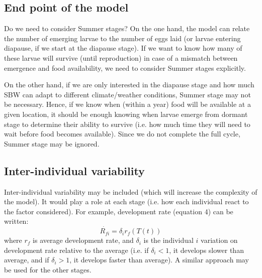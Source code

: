 \documentclass[12 pt]{article}
\begin{document}
\subsection{End point of the model}
Do we need to consider Summer stages? 
On the one hand, the model can relate the number of emerging larvae to the number of eggs laid (or larvae entering diapause, if we start at the diapause stage). If we want to know how many of these larvae will survive (until reproduction) in case of a mismatch between emergence and food availability, we need to consider Summer stages explicitly. \par
On the other hand, if we are only interested in the diapause stage and how much SBW can adapt to different climate/weather conditions, Summer stage may not be necessary. Hence, if we know when (within a year) food will be available at a given location, it should be enough knowing when larvae emerge from dormant stage to determine their ability to survive (i.e. how much time they will need to wait before food becomes available). Since we do not complete the full cycle, Summer stage may be ignored. \par
\subsection{Inter-individual variability}
Inter-individual variability may be included (which will increase the complexity of the model). It would play a role at each stage (i.e. how each individual react to the factor considered). For example, development rate (equation 4) can be written:
\begin{equation}\label{development}
\Dot{R_{fi}}=\delta _i r_f(T(t))
\end{equation}
where $r_f$ is average development rate, and $\delta _i$ is the individual $i$ variation on development rate relative to the average (i.e. if $\delta _i<1$, it develops slower than average, and if $\delta _i>1$, it develops faster than average). A similar approach may be used for the other stages.
\end{document}
